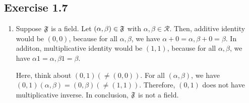 \documentclass{article}
\newcommand\R{\mathcal R}
\begin{document}
\subsection{Exercise 1.7}
\begin{enumerate}[label = (\alph*)]
\item
Suppose $\mathfrak F$ is a field.
Let $(\alpha,\beta) \in \mathfrak F$ with $\alpha,\beta \in \R$. 
Then, additive identity would be $(0,0)$, because for all $\alpha,\beta$, we have $\alpha + 0 = \alpha, \beta + 0 = \beta$.
In additon, multiplicative identity would be $(1,1)$, because for all $\alpha,\beta$, we have $\alpha1 = \alpha, \beta1 = \beta$.

Here, think about $(0,1) (\ne (0,0))$.
For all $(\alpha, \beta)$, we have $(0,1)(\alpha, \beta) = (0, \beta) (\ne (1,1))$. Therefore, $(0,1)$ does not have multiplicative inverse.
In conclusion, $\mathfrak F$ is not a field. 


\end{enumerate}
\end{document}

